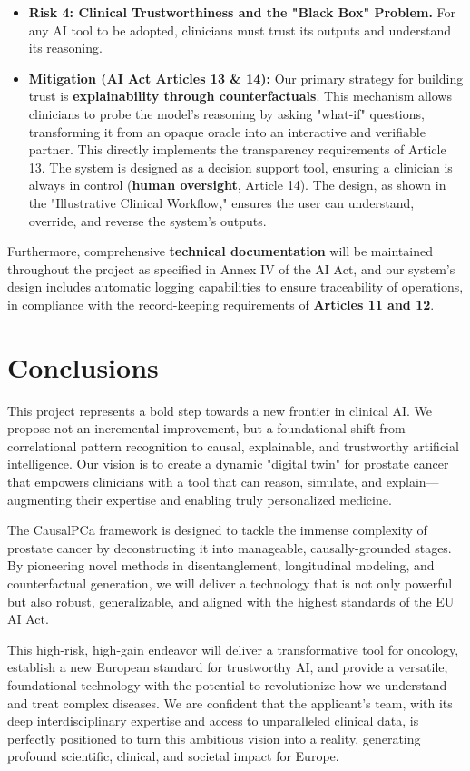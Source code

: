 \documentclass[11pt, a4paper]{article}
\begin{document}
\begin{itemize}
    \item \textbf{Risk 4: Clinical Trustworthiness and the "Black Box" Problem.} For any AI tool to be adopted, clinicians must trust its outputs and understand its reasoning.
    \item \textbf{Mitigation (AI Act Articles 13 \& 14):} Our primary strategy for building trust is \textbf{explainability through counterfactuals}. This mechanism allows clinicians to probe the model's reasoning by asking "what-if" questions, transforming it from an opaque oracle into an interactive and verifiable partner. This directly implements the transparency requirements of Article 13. The system is designed as a decision support tool, ensuring a clinician is always in control (\textbf{human oversight}, Article 14). The design, as shown in the "Illustrative Clinical Workflow," ensures the user can understand, override, and reverse the system's outputs.
\end{itemize}
Furthermore, comprehensive \textbf{technical documentation} will be maintained throughout the project as specified in Annex IV of the AI Act, and our system's design includes automatic logging capabilities to ensure traceability of operations, in compliance with the record-keeping requirements of \textbf{Articles 11 and 12}.

\section{Conclusions}
This project represents a bold step towards a new frontier in clinical AI. We propose not an incremental improvement, but a foundational shift from correlational pattern recognition to causal, explainable, and trustworthy artificial intelligence. Our vision is to create a dynamic "digital twin" for prostate cancer that empowers clinicians with a tool that can reason, simulate, and explain—augmenting their expertise and enabling truly personalized medicine.

The CausalPCa framework is designed to tackle the immense complexity of prostate cancer by deconstructing it into manageable, causally-grounded stages. By pioneering novel methods in disentanglement, longitudinal modeling, and counterfactual generation, we will deliver a technology that is not only powerful but also robust, generalizable, and aligned with the highest standards of the EU AI Act.

This high-risk, high-gain endeavor will deliver a transformative tool for oncology, establish a new European standard for trustworthy AI, and provide a versatile, foundational technology with the potential to revolutionize how we understand and treat complex diseases. We are confident that the applicant's team, with its deep interdisciplinary expertise and access to unparalleled clinical data, is perfectly positioned to turn this ambitious vision into a reality, generating profound scientific, clinical, and societal impact for Europe.



\end{document}
